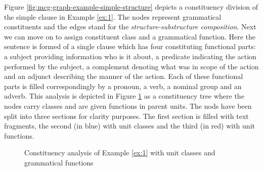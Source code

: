 Figure \ref{fig:mcg-graph-example-simple-structure} depicts a constituency division of the simple clause in Example \ref{ex:1}.%
The nodes represent grammatical constituents and the edges stand for the \textit{structure-substructure composition}. 
Next we can move on to assign constituent class and a grammatical function. 
Here the sentence is formed of a single clause which has four constituting functional parts: a subject providing information who is it about, a predicate indicating the action performed by the subject, a complement denoting what was in scope of the action and an adjunct describing the manner of the action. Each of these functional parts is filled correspondingly by a pronoun, a verb, a nominal group and an adverb. This analysis is depicted in Figure \ref{fig:constit-classes-example} as a constituency tree where the nodes carry classes and are given functions in parent units. The nods have been split into three sections for clarity purposes. The first section is filled with text fragments, the second (in blue) with unit classes and the third (in red) with unit functions. 

\begin{figure}[!ht]
    \centering
    \caption{Constituency analysis of Example \ref{ex:1} with unit classes and grammatical functions}
    \label{fig:constit-classes-example}
\end{figure}


